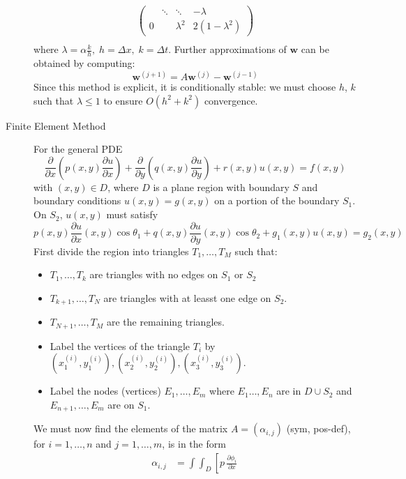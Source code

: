 \documentclass[8pt]{article}
\begin{document}
\begin{multicols}{2}
\begin{description}
\begin{equation*}
\begin{aligned}
\begin{pmatrix}
            & \ddots & \ddots & -\lambda\\
            0 & & \lambda^2 & 2(1-\lambda^2)
          \end{pmatrix} \\
      \end{aligned}
    \end{equation*}
    where $\lambda=\alpha\frac{k}{h},\;h=\Delta x,\;k=\Delta
    t$. Further approximations of $\mathbf{w}$ can be obtained by
    computing:
    $$ \mathbf{w}^{(j+1)} = A \mathbf{w}^{(j)} - \mathbf{w}^{(j-1)}$$
    Since this method is explicit, it is conditionally stable: we must
    choose $h$, $k$ such that $\lambda\leq1$ to ensure $O(h^2+k^2)$
    convergence.
  \item[Finite Element Method] For the general PDE
    $$ \frac{\partial}{\partial x}\left(p(x,y)\frac{\partial u}{\partial x}\right) +
    \frac{\partial}{\partial y}\left(q(x,y)\frac{\partial u}{\partial y}\right) +
    r(x,y)u(x,y)=f(x,y)$$
    with $(x,y) \in D$, where $D$ is a plane region with boundary $S$
    and boundary conditions $u(x,y)=g(x,y)$ on a portion of the
    boundary $S_1$. On $S_2$, $u(x,y)$ must satisfy
    $$ p(x,y)\frac{\partial u}{\partial x}(x,y)\cos\theta_1 +
    q(x,y)\frac{\partial u}{\partial y}(x,y)\cos\theta_2 +
    g_1(x,y)u(x,y) = g_2(x,y)$$
    First divide the region into triangles $T_1,\ldots,T_M$ such that:
    \begin{itemize}
    \item $T_1,\ldots,T_k$ are triangles with no edges on $S_1$ or $S_2$
    \item $T_{k+1},\ldots,T_N$ are triangles with at leasst one edge
      on $S_2$.
    \item $T_{N+1},\ldots,T_M$ are the remaining triangles.
    \item Label the vertices of the triangle $T_i$ by
      $(x_1^{(i)},y_1^{(i)}), (x_2^{(i)},y_2^{(i)}), (x_3^{(i)},y_3^{(i)})$.
    \item Label the nodes (vertices) $E_1,\ldots,E_m$ where
      $E_1\ldots,E_n$ are in $D \cup S_2$ and $E_{n+1},\ldots,E_m$
      are on $S_1$.
    \end{itemize}
    We must now find the elements of the matrix $A = (\alpha_{i,j})$
    (sym, pos-def), for $i=1,\ldots,n$ and $j=1,\ldots,m$, is in the form
    \begin{equation*}
      \begin{aligned}
        \alpha_{i,j} &=
        \int\int_{D}\left[
          p \,
          \frac{\partial\phi_i}{\partial x} \,

\end{aligned}
\end{equation*}
\end{description}
\end{multicols}
\end{document}
